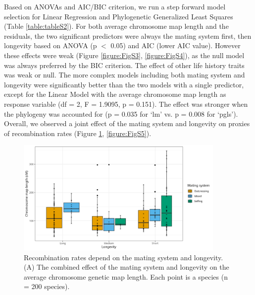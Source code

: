 \documentclass{article}
\begin{document}
Based on ANOVAs and AIC/BIC criterion, we run a step forward model selection for Linear Regression and Phylogenetic Generalized Least Squares (Table \ref{table:tableS2}). For both average chromosome map length and the residuals, the two significant predictors were always the mating system first, then longevity based on ANOVA (p $<$ 0.05) and AIC (lower AIC value). However these effects were weak (Figure \ref{figure:FigS3}, \ref{figure:FigS4}), as the null model was always preferred by the BIC criterion. The effect of other life history traits was weak or null. The more complex models including both mating system and longevity were significantly better than the two models with a single predictor, except for the Linear Model with the average chromosome map length as response variable (df = 2, F = 1.9095, p = 0.151). The effect was stronger when the phylogeny was accounted for (p = 0.035 for ‘lm’ vs. p = 0.008 for ‘pgls’). Overall, we observed a joint effect of the mating system and longevity on proxies of recombination rates (Figure \ref{figure:Fig2}, \ref{figure:FigS5}).



\begin{figure}[h!]
  \includegraphics[width=0.9\textwidth]{figures/Fig2.jpeg}
  \centering
  \caption{Recombination rates depend on the mating system and longevity. (A) The combined effect of the mating system and longevity on the average chromosome genetic map length. Each point is a species (n = 200 species).
  }
  \label{figure:Fig2}
\end{figure}
\end{document}
